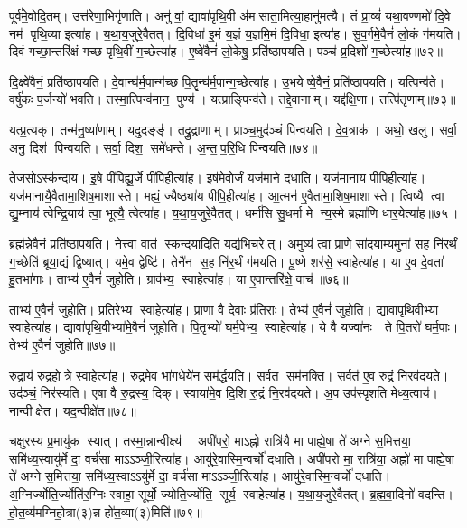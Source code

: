पूर्व॑मे॒वोदि॒तम्। उत्त॑रेणा॒भिगृ॑णाति। अनु॑ वां॒ द्यावा॑पृथि॒वी अ॑मसाता॒मित्या॒हानु॑मत्यै। तं प्रा॒व्यं॑ यथा॒वण्णमो॑ दि॒वे नम॑ पृथि॒व्या इत्या॑ह। य॒था॒य॒जुरे॒वैतत्। दि॒विधा॑ इ॒मं य॒ज्ञं य॒ज्ञमि॒मं दि॒विधा॒ इत्या॑ह। सु॒व॒र्गमे॒वैनं॑ लो॒कं ग॑मयति। दिवं॑ गच्छा॒न्तरि॑क्षं गच्छ पृथि॒वीं ग॒च्छेत्या॑ह। ए॒ष्वे॑वैनं॑ लो॒केषु॒ प्रति॑ष्ठापयति। पञ्च॑ प्र॒दिशो॑ ग॒च्छेत्या॑ह॥७२॥

दि॒क्ष्वे॑वैनं॒ प्रति॑ष्ठापयति। दे॒वान्घ॑र्म॒पान्ग॑च्छ पि॒तॄन्घ॑र्म॒पान्ग॒च्छे\-त्या॑ह। उ॒भयेष्वे॒वैनं॒ प्रति॑ष्ठापयति। यत्पिन्व॑ते। वर्\mbox{}षु॑कः प॒र्जन्यो॑ भवति। तस्मा॒त्पिन्व॑मान॒ पुण्य॑। यत्प्राङ्पिन्व॑ते। तद्दे॒वानाम्। यद्द॑क्षि॒णा। तत्पि॑तृ॒णाम्॥७३॥

यत्प्र॒त्यक्। तन्म॑नु॒ष्या॑णाम्। यदुदङ्ङ्॑। तद्रु॒द्राणाम्। प्राञ्च॒मुद॑ञ्चं पिन्वयति। दे॒व॒त्राक॑। अथो॒ खलु॑। सर्वा॒ अनु॒ दिश॑ पिन्वयति। सर्वा॒ दिश॒ समे॑धन्ते। अ॒न्त॒प॒रि॒धि पि॑न्वयति॥७४॥

तेज॒सोऽस्क॑न्दाय। इ॒षे पी॑पिह्यू॒र्जे पी॑पि॒हीत्या॑ह। इष॑मे॒वोर्जं॒ यज॑माने दधाति। यज॑मानाय पीपि॒हीत्या॑ह। यज॑मानायै॒वैतामा॒शिष॒माशास्ते। मह्यं॒ ज्यैष्ठ्या॑य पीपि॒हीत्या॑ह। आ॒त्मन॑ ए॒वैतामा॒शिष॒माशास्ते। त्विष्यै त्वा द्यु॒म्नाय॑ त्वेन्द्रि॒याय॑ त्वा॒ भूत्यै॒ त्वेत्या॑ह। य॒था॒य॒जुरे॒वैतत्। धर्मा॑सि सु॒धर्मा मे न्य॒स्मे ब्रह्मा॑णि धार॒येत्या॑ह॥७५॥

ब्रह्म॑न्ने॒वैनं॒ प्रति॑ष्ठापयति। नेत्त्वा॒ वात॑ स्क॒न्दया॒दिति॒ यद्य॑भि॒चरेत्। अ॒मुष्य॑ त्वा प्रा॒णे सा॑दयाम्य॒मुना॑ स॒ह नि॑र॒र्थं ग॒च्छेति॑ ब्रूया॒द्यं द्वि॒ष्यात्। यमे॒व द्वेष्टि॑। तेनै॑न स॒ह नि॑र॒र्थं ग॑मयति। पू॒ष्णे शर॑से॒ स्वाहेत्या॑ह। या ए॒व दे॒वता॑ हु॒तभा॑गाः। ताभ्य॑ ए॒वैनं॑ जुहोति। ग्राव॑भ्य॒ स्वाहेत्या॑ह। या ए॒वान्तरि॑क्षे॒ वाच॑॥७६॥

ताभ्य॑ ए॒वैनं॑ जुहोति। प्र॒ति॒रेभ्य॒ स्वाहेत्या॑ह। प्रा॒णा वै दे॒वाः प्र॑ति॒राः। तेभ्य॑ ए॒वैनं॑ जुहोति। द्यावा॑पृथि॒वीभ्या॒ स्वाहेत्या॑ह। द्यावा॑पृथि॒वीभ्या॑मे॒वैनं॑ जुहोति। पि॒तृभ्यो॑ घर्म॒पेभ्य॒ स्वाहेत्या॑ह। ये वै यज्वा॑नः। ते पि॒तरो॑ घर्म॒पाः। तेभ्य॑ ए॒वैनं॑ जुहोति॥७७॥

रु॒द्राय॑ रु॒द्रहोत्रे॒ स्वाहेत्या॑ह। रु॒द्रमे॒व भा॑ग॒धेये॑न॒ सम॑र्द्धयति। स॒र्वत॒ सम॑नक्ति। स॒र्वत॑ ए॒व रु॒द्रं नि॒रव॑दयते। उद॑ञ्चं॒ निर॑स्यति। ए॒षा वै रु॒द्रस्य॒ दिक्। स्वाया॑मे॒व दि॒शि रु॒द्रं नि॒रव॑दयते। अ॒प उप॑स्पृशति मेध्य॒त्वाय॑। नान्वीक्षेत। यद॒न्वीक्षे॑त॥७८॥

चक्षु॑रस्य प्र॒मायु॑क स्यात्। तस्मा॒न्नान्वीक्ष्य॑। अपी॑परो॒ माऽह्नो॒ रात्रि॑यै मा पाह्ये॒षा ते॑ अग्ने स॒मित्तया॒ समि॑ध्य॒स्वायु॑र्मे दा॒ वर्च॑सा माऽऽञ्जी॒रित्या॑ह। आयु॑रे॒वास्मि॒न्वर्चो॑ दधाति। अपी॑परो मा॒ रात्रि॑या॒ अह्नो॑ मा पाह्ये॒षा ते॑ अग्ने स॒मित्तया॒ समि॑ध्य॒स्वाऽऽयु॑र्मे दा॒ वर्च॑सा माऽऽञ्जी॒रित्या॑ह। आयु॑रे॒वास्मि॒न्वर्चो॑ दधाति। अ॒ग्निर्ज्योति॒र्ज्योति॑र॒ग्निः स्वाहा॒ सूर्यो॒ ज्योति॒र्ज्योति॒ सूर्य॒ स्वाहेत्या॑ह। य॒था॒य॒जुरे॒वैतत्। ब्र॒ह्म॒वा॒दिनो॑ वदन्ति। हो॒त॒व्य॑मग्निहो॒त्रा(३)न्न हो॑त॒व्या(३)मिति॑॥७९॥

